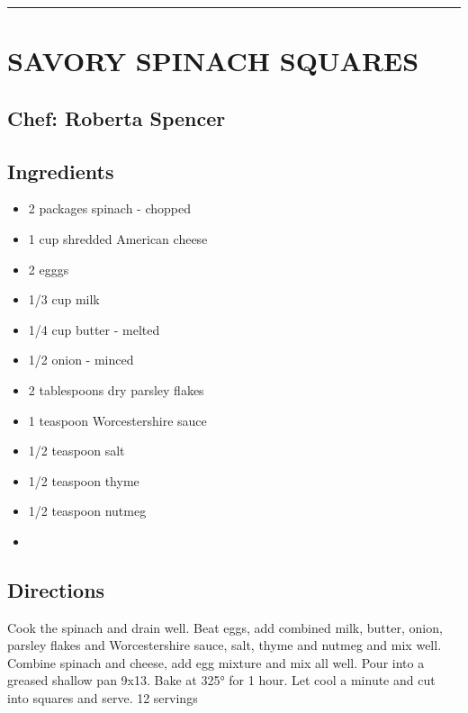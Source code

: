 \documentclass[
]{book}
\begin{document}
\begin{center}\rule{0.5\linewidth}{0.5pt}\end{center}

\hypertarget{savory-spinach-squares}{%
\section*{SAVORY SPINACH SQUARES}\label{savory-spinach-squares}}


\hypertarget{chef-roberta-spencer-11}{%
\subsection*{Chef: Roberta Spencer}\label{chef-roberta-spencer-11}}


\hypertarget{ingredients-37}{%
\subsection*{Ingredients}\label{ingredients-37}}


\begin{itemize}
\item
  2 packages spinach - chopped
\item
  1 cup shredded American cheese
\item
  2 egggs
\item
  1/3 cup milk
\item
  1/4 cup butter - melted
\item
  1/2 onion - minced
\item
  2 tablespoons dry parsley flakes
\item
  1 teaspoon Worcestershire sauce
\item
  1/2 teaspoon salt
\item
  1/2 teaspoon thyme
\item
  1/2 teaspoon nutmeg
\item
\end{itemize}

\hypertarget{directions-37}{%
\subsection*{Directions}\label{directions-37}}


Cook the spinach and drain well. Beat eggs, add combined milk, butter, onion, parsley flakes and Worcestershire sauce, salt, thyme and nutmeg and mix well. Combine spinach and cheese, add egg mixture and mix all well. Pour into a greased shallow pan 9x13. Bake at 325° for 1 hour. Let cool a minute and cut into squares and serve. 12 servings
\end{document}
